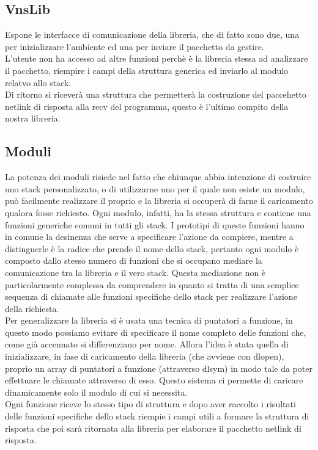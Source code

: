 \subsection{VnsLib}
Espone le interfacce di comunicazione della libreria, che di fatto sono due, una per inizializzare l'ambiente ed una per inviare il pacchetto da gestire.\\
L'utente non ha accesso ad altre funzioni perch\`e \`e la libreria stessa ad analizzare il pacchetto, riempire i campi della struttura generica ed inviarlo al modulo relatvo allo stack.\\
Di ritorno si ricever\`a una struttura che permetter\`a la costruzione del paccehetto netlink di risposta alla recv del programma, questo \`e l'ultimo compito della nostra libreria.
\subsection{Moduli}
La potenza dei moduli risiede nel fatto che chiunque abbia intenzione di costruire uno stack personalizzato, o di utilizzarne uno per il quale non esiste un modulo, pu\`o facilmente realizzare il proprio e la libreria si occuper\`a di farne il caricamento qualora fosse richiesto.
Ogni modulo, infatti, ha la stessa struttura e contiene una funzioni generiche comuni in tutti gli stack. I prototipi di queste funzioni hanno in comune la desinenza che serve a specificare l'azione da compiere, mentre a distinguerle \`e la radice che prende il nome dello stack, pertanto ogni modulo \`e composto dallo stesso numero di funzioni che si occupano mediare la comunicazione tra la libreria e il vero stack. Questa mediazione non \`e particolarmente complessa da comprendere in quanto si tratta di una semplice sequenza di chiamate alle funzioni specifiche dello stack per realizzare l'azione della richiesta.\\
Per generalizzare la libreria si \`e usata una tecnica di puntatori a funzione, in questo modo possiamo evitare di specificare il nome completo delle funzioni che, come gi\`a accennato si differenziano per nome. Allora l'idea \`e stata quella di inizializzare, in fase di caricamento della libreria (che avviene con dlopen), proprio un array di puntatori a funzione (attraverso dlsym) in modo tale da poter effettuare le chiamate attraverso di esso. Questo sistema ci permette di caricare dinamicamente solo il modulo di cui si necessita.\\
Ogni funzione riceve lo stesso tipo di struttura e dopo aver raccolto i risultati delle funzioni specifiche dello stack riempie i campi utili a formare la struttura di risposta che poi sar\`a ritornata alla libreria per elaborare il pacchetto netlink di risposta.
